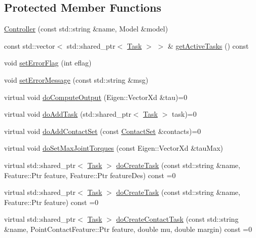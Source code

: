 \subsection*{Protected Member Functions}
\begin{DoxyCompactItemize}
\item 
\hyperlink{classocra_1_1Controller_a9f72394baa089119cf0b60e3c7160283}{Controller} (const std\+::string \&name, Model \&model)
\item 
const std\+::vector$<$ std\+::shared\+\_\+ptr$<$ \hyperlink{classocra_1_1Task}{Task} $>$ $>$ \& \hyperlink{classocra_1_1Controller_a47992af5b31c540f8bd7a828eb768276}{get\+Active\+Tasks} () const
\item 
void \hyperlink{classocra_1_1Controller_a36df4135749c17f6d4425fabed37d022}{set\+Error\+Flag} (int eflag)
\item 
void \hyperlink{classocra_1_1Controller_a3e8c327d25152d457172a65d826c84b4}{set\+Error\+Message} (const std\+::string \&msg)
\item 
virtual void \hyperlink{classocra_1_1Controller_a8ca85413067d948459afa5981b3dda32}{do\+Compute\+Output} (Eigen\+::\+Vector\+Xd \&tau)=0
\item 
virtual void \hyperlink{classocra_1_1Controller_ab3477822a9363553c99eefa58ff803eb}{do\+Add\+Task} (std\+::shared\+\_\+ptr$<$ \hyperlink{classocra_1_1Task}{Task} $>$ task)=0
\item 
virtual void \hyperlink{classocra_1_1Controller_acb11edc1ceaa89423c1e58f9cb38a9f7}{do\+Add\+Contact\+Set} (const \hyperlink{classocra_1_1ContactSet}{Contact\+Set} \&contacts)=0
\item 
virtual void \hyperlink{classocra_1_1Controller_a75d6419229980f6088a689fcafc1d224}{do\+Set\+Max\+Joint\+Torques} (const Eigen\+::\+Vector\+Xd \&tau\+Max)
\item 
virtual std\+::shared\+\_\+ptr$<$ \hyperlink{classocra_1_1Task}{Task} $>$ \hyperlink{classocra_1_1Controller_a05f6d757e4125a71bf766df7f069ac43}{do\+Create\+Task} (const std\+::string \&name, Feature\+::\+Ptr feature, Feature\+::\+Ptr feature\+Des) const =0
\item 
virtual std\+::shared\+\_\+ptr$<$ \hyperlink{classocra_1_1Task}{Task} $>$ \hyperlink{classocra_1_1Controller_a358a31c0b6b6bdcc0e6da5c49eb9fde5}{do\+Create\+Task} (const std\+::string \&name, Feature\+::\+Ptr feature) const =0
\item 
virtual std\+::shared\+\_\+ptr$<$ \hyperlink{classocra_1_1Task}{Task} $>$ \hyperlink{classocra_1_1Controller_a823933d261a12aac49f8a0ef56823ea4}{do\+Create\+Contact\+Task} (const std\+::string \&name, Point\+Contact\+Feature\+::\+Ptr feature, double mu, double margin) const =0
\end{DoxyCompactItemize}
